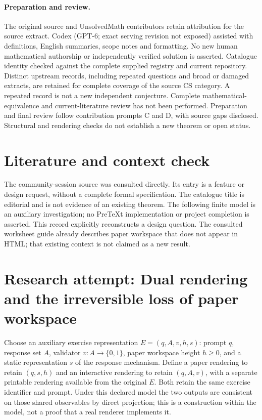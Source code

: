 \documentclass[11pt]{article}
\begin{document}
\paragraph{Preparation and review.}
The original source and UnsolvedMath contributors retain attribution for the source extract. Codex (GPT-6; exact serving revision not exposed) assisted with definitions, English summaries, scope notes and formatting. No new human mathematical authorship or independently verified solution is asserted. Catalogue identity checked against the complete supplied registry and current repository. Distinct upstream records, including repeated questions and broad or damaged extracts, are retained for complete coverage of the source CS category. A repeated record is not a new independent conjecture. Complete mathematical-equivalence and current-literature review has not been performed. Preparation and final review follow contribution prompts C and D, with source gaps disclosed. Structural and rendering checks do not establish a new theorem or open status.
\label{end:statement}

\section{Literature and context check}
The community-session source was consulted directly. Its entry is a feature or design request, without a complete formal specification. The catalogue title is editorial and is not evidence of an existing theorem. The following finite model is an auxiliary investigation; no PreTeXt implementation or project completion is asserted. This record explicitly reconstructs a design question. The consulted worksheet guide already describes paper workspace that does not appear in HTML; that existing context is not claimed as a new result.
\section{Research attempt: Dual rendering and the irreversible loss of paper workspace}
Choose an auxiliary exercise representation $E=(q,A,v,h,s)$: prompt $q$, response set $A$, validator $v:A\to\{0,1\}$, paper workspace height $h\ge0$, and a static representation $s$ of the response mechanism. Define a paper rendering to retain $(q,s,h)$ and an interactive rendering to retain $(q,A,v)$, with a separate printable rendering available from the original $E$. Both retain the same exercise identifier and prompt. Under this declared model the two outputs are consistent on those shared observables by direct projection; this is a construction within the model, not a proof that a real renderer implements it.
\end{document}
